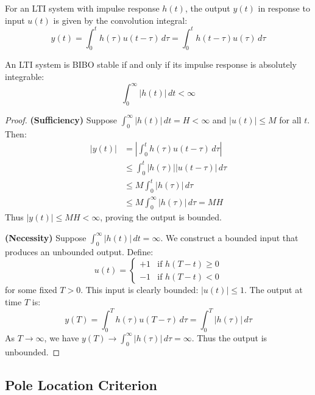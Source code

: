 For an LTI system with impulse response $h(t)$, the output $y(t)$ in response to input $u(t)$ is given by the convolution integral:
\begin{equation}
y(t) = \int_0^t h(\tau) u(t-\tau) \, d\tau = \int_0^t h(t-\tau) u(\tau) \, d\tau
\label{eq:convolution}
\end{equation}

\begin{theorem}
\label{thm:impulse_stability}
An LTI system is BIBO stable if and only if its impulse response is absolutely integrable:
\begin{equation}
\int_0^\infty |h(t)| \, dt < \infty
\label{eq:absolute_integrable}
\end{equation}
\end{theorem}

\begin{proof}
\textbf{(Sufficiency)} Suppose $\int_0^\infty |h(t)| \, dt = H < \infty$ and $|u(t)| \leq M$ for all $t$. Then:
\begin{align}
|y(t)| &= \left| \int_0^t h(\tau) u(t-\tau) \, d\tau \right| \\
&\leq \int_0^t |h(\tau)| |u(t-\tau)| \, d\tau \\
&\leq M \int_0^t |h(\tau)| \, d\tau \\
&\leq M \int_0^\infty |h(\tau)| \, d\tau = MH
\end{align}
Thus $|y(t)| \leq MH < \infty$, proving the output is bounded.

\textbf{(Necessity)} Suppose $\int_0^\infty |h(t)| \, dt = \infty$. We construct a bounded input that produces an unbounded output. Define:
\begin{equation}
u(t) = \begin{cases}
+1 & \text{if } h(T-t) \geq 0 \\
-1 & \text{if } h(T-t) < 0
\end{cases}
\end{equation}
for some fixed $T > 0$. This input is clearly bounded: $|u(t)| \leq 1$. The output at time $T$ is:
\begin{equation}
y(T) = \int_0^T h(\tau) u(T-\tau) \, d\tau = \int_0^T |h(\tau)| \, d\tau
\end{equation}
As $T \to \infty$, we have $y(T) \to \int_0^\infty |h(\tau)| \, d\tau = \infty$. Thus the output is unbounded.
\end{proof}

\subsection{Pole Location Criterion}

